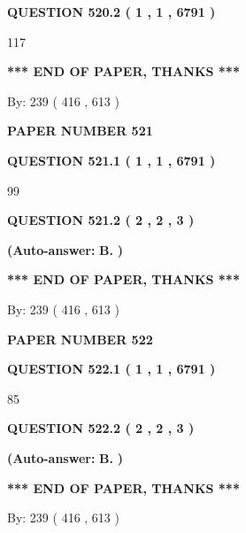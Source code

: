 \documentclass{ctexart}
\begin{document}
  
{\textbf{\large{QUESTION
520.2 
 ( 1 , 1 , 6791 )
}}}

117
   
   
   
   
\vspace{1.0in} 
{\textbf{\large{ *** END OF PAPER, THANKS *** }}} 
   
   
\hspace{1.0in} By: 
 239 ( 416 ,  613 )
   
   
   
   
\newpage 
\setcounter{page}{ 
   521001 } 
   
   
 {\textbf{ \Large{ PAPER NUMBER  521  }}}
   
   
   
   
  
  
{\textbf{\large{QUESTION
521.1 
 ( 1 , 1 , 6791 )
}}}

99
  
  
{\textbf{\large{QUESTION
521.2 
 ( 2 , 2 , 3 )
}}}
 
 
{\textbf{(Auto-answer:}}
{\textbf{\large{
B.}}}
{\textbf{)}}
 
 
   
   
   
   
\vspace{1.0in} 
{\textbf{\large{ *** END OF PAPER, THANKS *** }}} 
   
   
\hspace{1.0in} By: 
 239 ( 416 ,  613 )
   
   
   
   
\newpage 
\setcounter{page}{ 
   522001 } 
   
   
 {\textbf{ \Large{ PAPER NUMBER  522  }}}
   
   
   
   
  
  
{\textbf{\large{QUESTION
522.1 
 ( 1 , 1 , 6791 )
}}}

85
  
  
{\textbf{\large{QUESTION
522.2 
 ( 2 , 2 , 3 )
}}}
 
 
{\textbf{(Auto-answer:}}
{\textbf{\large{
B.}}}
{\textbf{)}}
 
 
   
   
   
   
\vspace{1.0in} 
{\textbf{\large{ *** END OF PAPER, THANKS *** }}} 
   
   
\hspace{1.0in} By: 
 239 ( 416 ,  613 )
   
   
   
\end{document}
